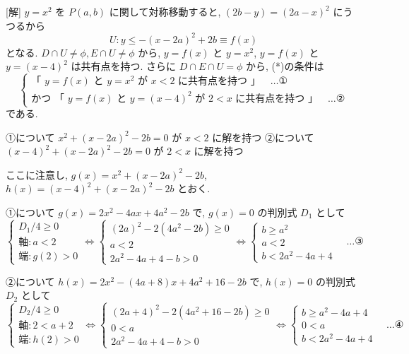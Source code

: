 \documentclass[../main.tex]{subfiles}
\begin{document}
[解] $y=x^2$ を $P(a,b)$ に関して対称移動すると, $(2b-y) = (2a-x)^2$ にうつるから
\[
  U: y \le -(x-2a)^2 + 2b \equiv f(x)
\]
となる. $D \cap U \neq \phi, E \cap U \neq \phi$ から, $y=f(x)$ と $y=x^2$, $y=f(x)$ と $y=(x-4)^2$ は共有点を持つ.
さらに $D \cap E \cap U = \phi$ から, (*)の条件は
\[
  \begin{cases}
    \text{「 } y=f(x) \text{ と } y=x^2 \text{ が } x < 2 \text{ に共有点を持つ 」} \quad \dots \text{①} \\
    \text{かつ 「 } y=f(x) \text{ と } y=(x-4)^2 \text{ が } 2 < x \text{ に共有点を持つ 」} \quad \dots \text{②}
  \end{cases}
\]
である.

①について $x^2 + (x-2a)^2 - 2b = 0$ が $x < 2$ に解を持つ
②について $(x-4)^2 + (x-2a)^2 - 2b = 0$ が $2 < x$ に解を持つ

ここに注意し, $g(x) = x^2 + (x-2a)^2 - 2b$, $h(x) = (x-4)^2 + (x-2a)^2 - 2b$ とおく.

①について
$g(x) = 2x^2 - 4ax + 4a^2 - 2b$ で, $g(x)=0$ の判別式 $D_1$ として
\[
  \begin{cases}
    D_1/4 \ge 0 \\
    \text{軸} : a < 2 \\
    \text{端} : g(2) > 0
  \end{cases}
  \iff
  \begin{cases}
    (2a)^2 - 2(4a^2 - 2b) \ge 0 \\
    a < 2 \\
    2a^2 - 4a + 4 - b > 0
  \end{cases}
  \iff
  \begin{cases}
    b \ge a^2 \\
    a < 2 \\
    b < 2a^2 - 4a + 4
  \end{cases}
  \quad \dots \text{③}
\]

②について
$h(x) = 2x^2 - (4a+8)x + 4a^2 + 16 - 2b$ で, $h(x)=0$ の判別式 $D_2$ として
\[
  \begin{cases}
    D_2/4 \ge 0 \\
    \text{軸} : 2 < a+2 \\
    \text{端} : h(2) > 0
  \end{cases}
  \iff
  \begin{cases}
    (2a+4)^2 - 2(4a^2 + 16 - 2b) \ge 0 \\
    0 < a \\
    2a^2 - 4a + 4 - b > 0
  \end{cases}
  \iff
  \begin{cases}
    b \ge a^2 - 4a + 4 \\
    0 < a \\
    b < 2a^2 - 4a + 4
  \end{cases}
  \quad \dots \text{④}
\]
\end{document}
